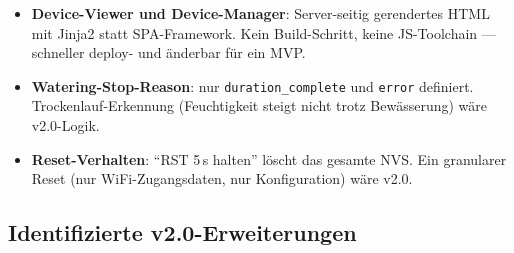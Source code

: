 \documentclass[a4paper,12pt]{article}
\begin{document}
\begin{itemize}
        ThingsBoard inklusive Token-Erzeugung über die Admin-API
        bleibt v2.0-Aufgabe.
  \item \textbf{Device-Viewer und Device-Manager}: Server-seitig
        gerendertes HTML mit Jinja2 statt SPA-Framework. Kein
        Build-Schritt, keine JS-Toolchain --- schneller deploy- und
        änderbar für ein MVP.
  \item \textbf{Watering-Stop-Reason}: nur \texttt{duration\_complete}
        und \texttt{error} definiert. Trockenlauf-Erkennung
        (Feuchtigkeit steigt nicht trotz Bewässerung) wäre
        v2.0-Logik.
  \item \textbf{Reset-Verhalten}: ``RST 5\,s halten'' löscht das
        gesamte NVS. Ein granularer Reset (nur WiFi-Zugangsdaten,
        nur Konfiguration) wäre v2.0.
\end{itemize}

\subsection{Identifizierte v2.0-Erweiterungen}
\end{document}
